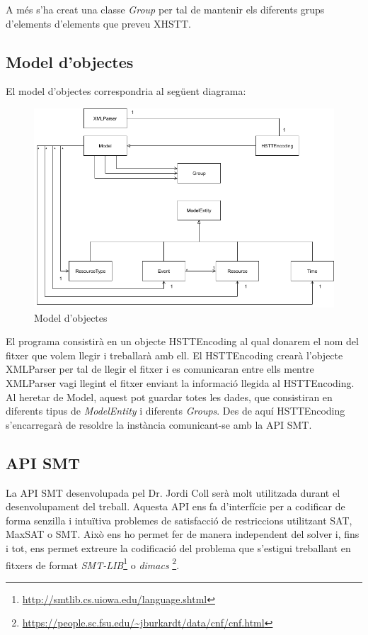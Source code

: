 \documentclass[11pt,a4paper,twoside]{report}
\begin{document}
  A més s'ha creat una classe \textit{Group} per tal de mantenir els diferents grups d'elements d'elements que preveu XHSTT.  


  \subsection{Model d'objectes}

  El model d'objectes correspondria al següent diagrama:
  \begin{figure}[H]
    \includegraphics[width=\textwidth]{Diagrames/UMLKai.png}
    \caption{Model d'objectes}
    \label{fig:ObjectModel}
  \end{figure}
  

  El programa consistirà en un objecte HSTTEncoding al qual donarem el nom del fitxer que volem llegir i treballarà amb ell. 
  El HSTTEncoding crearà l'objecte XMLParser per tal de llegir el fitxer i es comunicaran entre ells mentre XMLParser vagi llegint el fitxer enviant la informació llegida al HSTTEncoding. 
  Al heretar de Model, aquest pot guardar totes les dades, que consistiran en diferents tipus de \textit{ModelEntity} i diferents \textit{Groups}.
  Des de aquí HSTTEncoding s'encarregarà de resoldre la instància comunicant-se amb la API SMT.

  \subsection{API SMT}

  La API SMT desenvolupada pel Dr. Jordi Coll serà molt utilitzada durant el desenvolupament del treball.
  Aquesta API ens fa d'interfície per a codificar de forma senzilla i intuïtiva 
  problemes de satisfacció de restriccions utilitzant SAT, MaxSAT o SMT. 
  Això ens ho permet fer de manera independent del solver i, fins i tot,
  ens permet extreure la codificació del problema que s'estigui treballant 
  en fitxers de format \textit{SMT-LIB}\footnote{\url{http://smtlib.cs.uiowa.edu/language.shtml}} o 
  \textit{dimacs} \footnote{\url{https://people.sc.fsu.edu/~jburkardt/data/cnf/cnf.html}}.
\end{document}
